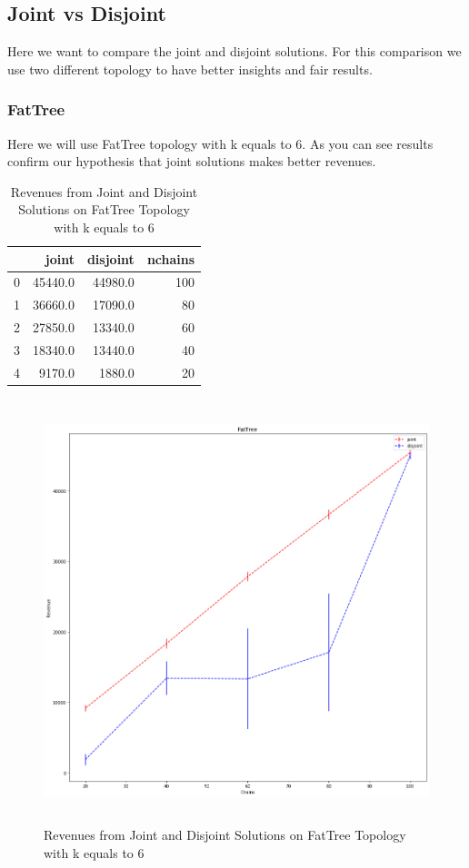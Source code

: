 \subsection{Joint vs Disjoint}\label{sec:joint-vs-disjoint}
Here we want to compare the joint and disjoint solutions.
For this comparison we use two different topology to have better insights and fair results.

\subsubsection{FatTree}
Here we will use FatTree topology with k equals to 6.
As you can see results confirm our hypothesis that joint solutions makes better revenues.

\begin{table}[H]
    \caption{Revenues from Joint and Disjoint Solutions on FatTree Topology with k equals to 6}
    \label{tbl:joint-vs-disjoin-fattree}
    \medskip
    \centering
    \begin{tabular}{lrrr}
        \toprule
        {} &    joint &  disjoint &  nchains \\
        \midrule
        0 &  45440.0 &   44980.0 &      100 \\
        1 &  36660.0 &   17090.0 &       80 \\
        2 &  27850.0 &   13340.0 &       60 \\
        3 &  18340.0 &   13440.0 &       40 \\
        4 &   9170.0 &    1880.0 &       20 \\
        \bottomrule
    \end{tabular}
\end{table}

\begin{figure}[H]
    \centering
    \includegraphics[height=350pt]{plots/joint-vs-disjoint-fattree.png}
    \caption{Revenues from Joint and Disjoint Solutions on FatTree Topology with k equals to 6}
    \label{fig:joint-vs-disjoint-fattree}
\end{figure}

